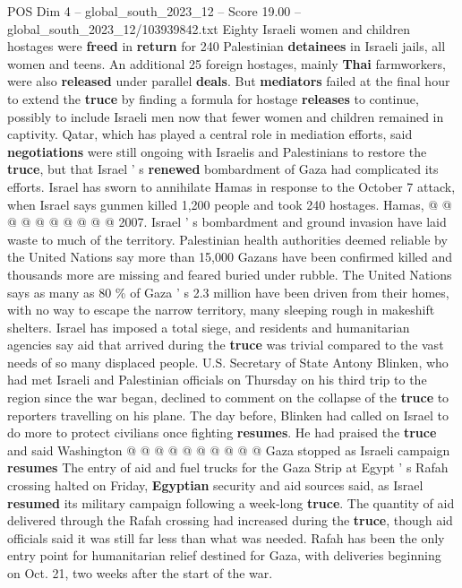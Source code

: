 \begin{textsample}{POS Dim 4 – global\_south\_2023\_12 – Score 19.00 – global\_south\_2023\_12/103939842.txt}
Eighty Israeli women and children hostages were \textbf{freed} in \textbf{return} for 240 Palestinian \textbf{detainees} in Israeli jails, all women and teens.
An additional 25 foreign hostages, mainly \textbf{Thai} farmworkers, were also \textbf{released} under parallel \textbf{deals}.
But \textbf{mediators} failed at the final hour to extend the \textbf{truce} by finding a formula for hostage \textbf{releases} to continue, possibly to include Israeli men now that fewer women and children remained in captivity.
Qatar, which has played a central role in mediation efforts, said \textbf{negotiations} were still ongoing with Israelis and Palestinians to restore the \textbf{truce}, but that Israel ' s \textbf{renewed} bombardment of Gaza had complicated its efforts.
Israel has sworn to annihilate Hamas in response to the October 7 attack, when Israel says gunmen killed 1,200 people and took 240 hostages.
Hamas, @ @ @ @ @ @ @ @ @ @ 2007.
Israel ' s bombardment and ground invasion have laid waste to much of the territory.
Palestinian health authorities deemed reliable by the United Nations say more than 15,000 Gazans have been confirmed killed and thousands more are missing and feared buried under rubble.
The United Nations says as many as 80 \% of Gaza ' s 2.3 million have been driven from their homes, with no way to escape the narrow territory, many sleeping rough in makeshift shelters.
Israel has imposed a total siege, and residents and humanitarian agencies say aid that arrived during the \textbf{truce} was trivial compared to the vast needs of so many displaced people.
U.S.
Secretary of State Antony Blinken, who had met Israeli and Palestinian officials on Thursday on his third trip to the region since the war began, declined to comment on the collapse of the \textbf{truce} to reporters travelling on his plane.
The day before, Blinken had called on Israel to do more to protect civilians once fighting \textbf{resumes}.
He had praised the \textbf{truce} and said Washington @ @ @ @ @ @ @ @ @ @ Gaza stopped as Israeli campaign \textbf{resumes} The entry of aid and fuel trucks for the Gaza Strip at Egypt ' s Rafah crossing halted on Friday, \textbf{Egyptian} security and aid sources said, as Israel \textbf{resumed} its military campaign following a week-long \textbf{truce}.
The quantity of aid delivered through the Rafah crossing had increased during the \textbf{truce}, though aid officials said it was still far less than what was needed.
Rafah has been the only entry point for humanitarian relief destined for Gaza, with deliveries beginning on Oct. 21, two weeks after the start of the war.

\end{textsample}
